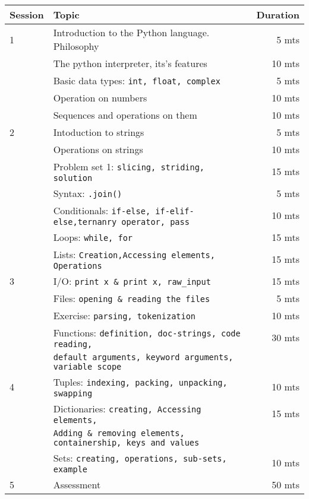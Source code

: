 \documentclass{article}
\begin{document}
\begin{tabular}{llr}
\hline
Session & Topic & Duration\\\hline
1 & Introduction to the Python language. Philosophy                  & ~5 mts\\
  & The python interpreter, its's features                           & 10 mts \\
  & Basic data types: \tt{int, float, complex}                       & ~5 mts \\
  & Operation on numbers                                             & 10 mts\\
  & Sequences and operations on them                                 & 10 mts\\\hline

2 & Intoduction to strings                                           & ~5 mts\\
  & Operations on strings                                            & 10 mts\\
  & Problem set 1: \tt{slicing, striding, solution}                   & 15 mts\\
  & Syntax: \tt{.join()}                                             & ~5 mts\\
  & Conditionals: \tt{if-else, if-elif-else,ternanry operator, pass} & 10 mts\\
  & Loops: \tt{while, for}                                           & 15 mts\\
  & Lists: \tt{Creation,Accessing elements, Operations}              & 15 mts\\\hline

3 & I/O: \tt{print x \& print x, raw\_input}                          & 15 mts\\
  & Files: \tt{opening \& reading the files}                         & ~5 mts\\
  & Exercise: \tt{parsing, tokenization}                             & 10 mts\\
  & Functions: \tt{definition, doc-strings, code reading,}           & 30 mts\\
  & \tt{default arguments, keyword arguments, variable scope}        &\\\hline

4 & Tuples: \tt{indexing, packing, unpacking, swapping}               & 10 mts\\
  & Dictionaries: \tt{creating, Accessing elements,}                  & 15 mts\\
  & \tt{Adding \& removing elements, containership, keys and values}  &\\
  & Sets: \tt{creating, operations, sub-sets, example}                & 10 mts\\\hline

5 & Assessment                                                       & 50 mts\\\hline\hline
\end{tabular}
\end{document}
